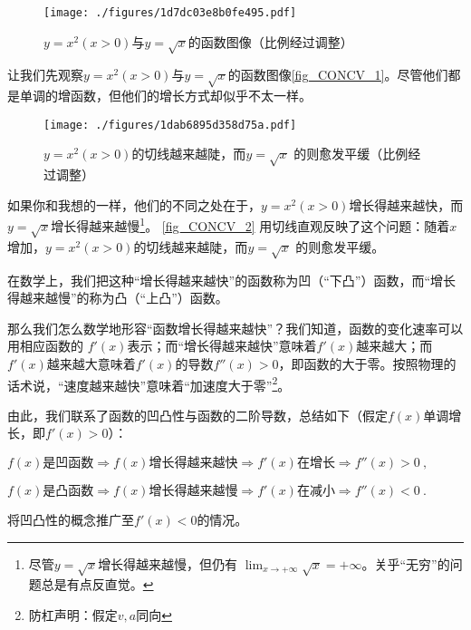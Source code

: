 

\begin{figure}[ht]
\centering
\texttt{[image: ./figures/1d7dc03e8b0fe495.pdf]}
\caption{$y=x^2 (x>0)$与$y=\sqrt{x}$的函数图像（比例经过调整）} \label{fig_CONCV_1}
\end{figure}

让我们先观察$y=x^2 (x>0)$与$y=\sqrt{x}$的函数图像\autoref{fig_CONCV_1}。尽管他们都是单调的增函数，但他们的增长方式却似乎不太一样。

\begin{figure}[ht]
\centering
\texttt{[image: ./figures/1dab6895d358d75a.pdf]}
\caption{$y=x^2 (x>0)$的切线越来越陡，而$y=\sqrt{x}$ 的则愈发平缓（比例经过调整）} \label{fig_CONCV_2}
\end{figure}

如果你和我想的一样，他们的不同之处在于，$y=x^2 (x>0)$增长得越来越快，而$y=\sqrt{x}$增长得越来越慢\footnote{尽管$y=\sqrt{x}$增长得越来越慢，但仍有 $\lim_{x\to+\infty} \sqrt{x} = +\infty$。关乎“无穷”的问题总是有点反直觉。}。
\autoref{fig_CONCV_2} 用切线直观反映了这个问题：随着$x$增加，$y=x^2 (x>0)$的切线越来越陡，而$y=\sqrt{x}$ 的则愈发平缓。

在数学上，我们把这种“增长得越来越快”的函数称为凹（“下凸”）函数，而“增长得越来越慢”的称为凸（“上凸”）函数。



那么我们怎么数学地形容“函数增长得越来越快”？我们知道，函数的变化速率可以用相应函数的 $f'(x)$表示；而“增长得越来越快”意味着$f'(x)$越来越大；而$f'(x)$越来越大意味着$f'(x)$的导数$f''(x)>0$，即函数的大于零。按照物理的话术说，“速度越来越快”意味着“加速度大于零”\footnote{防杠声明：假定$v,a$同向}。

由此，我们联系了函数的凹凸性与函数的二阶导数，总结如下（假定$f(x)$单调增长，即$f'(x)>0$）：

$f(x)\text{是凹函数} \Rightarrow f(x)\text{增长得越来越快}\Rightarrow f'(x)\text{在增长} \Rightarrow f''(x)>0~,$

$f(x)\text{是凸函数} \Rightarrow f(x)\text{增长得越来越慢}\Rightarrow f'(x)\text{在减小} \Rightarrow f''(x)<0~.$

\begin{exercise}{}
将凹凸性的概念推广至$f'(x)<0$的情况。
\end{exercise}

